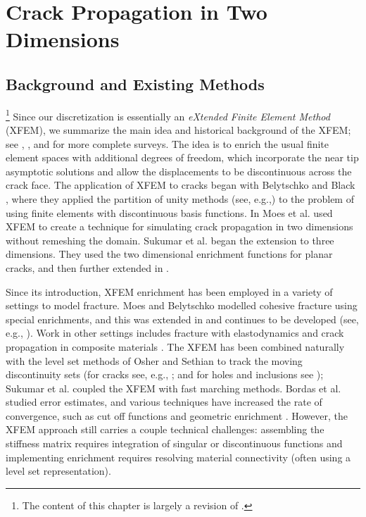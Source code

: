 %

\chapter{Crack Propagation in Two Dimensions} \label{ch:pt1.crackpropagation}

\section{Background and Existing Methods}

\footnote{The content of this chapter is largely a revision of \cite{Richardson11}.}
Since our discretization is essentially an \emph{eXtended Finite Element Method} (XFEM), we summarize the main idea and historical background of the XFEM; see \cite{Belytschko09}, \cite{Karihaloo03}, and \cite{Abdelaziz08} for more complete surveys. The idea is to enrich the usual finite element spaces with additional degrees of freedom, which incorporate the near tip asymptotic solutions and allow the displacements to be discontinuous across the crack face. The application of XFEM to cracks began with Belytschko and Black \cite{Belytschko99}, where they applied the partition of unity methods (see, e.g.,\cite{Melenk96}) to the problem of using finite elements with discontinuous basis functions. In \cite{Moes99} Moes et al. used XFEM to create a technique for simulating crack propagation in two dimensions without remeshing the domain. Sukumar et al. \cite{Sukumar00} began the extension to three dimensions. They used the two dimensional enrichment functions for planar cracks, and then further extended in \cite{Areias05}.

Since its introduction, XFEM enrichment has been employed in a variety of settings to model fracture. Moes and Belytschko \cite{Moes02b} modelled cohesive fracture using special enrichments, and this was extended in \cite{Zi.Goangseup03} and continues to be developed (see, e.g., \cite{Mariani03, Borst04, Asferg07}). Work in other settings includes fracture with elastodynamics \cite{Belytschko04} and crack propagation in composite materials \cite{Huynh09}. The XFEM has been combined naturally with the level set methods of Osher and Sethian \cite{Osher88, Osher04} to track the moving discontinuity sets (for cracks see, e.g., \cite{Belytschko01, Moes02a, Gravouil02, Duflot07, Prabel07}; and for holes and inclusions see \cite{Sukumar01}); Sukumar et al. \cite{Sukumar08} coupled the XFEM with fast marching methods. Bordas et al. \cite{Bordas07} studied error estimates, and various techniques have increased the rate of convergence, such as cut off functions and geometric enrichment \cite{Chahine06, Chahine08, Shen09}. However, the XFEM approach still carries a couple technical challenges: assembling the stiffness matrix requires integration of singular or discontinuous functions and implementing enrichment requires resolving material connectivity (often using a level set representation).

